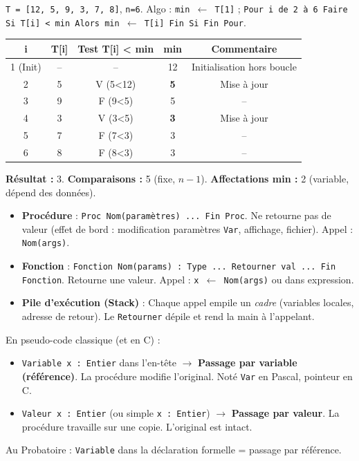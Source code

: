 \documentclass[11pt]{article}
\begin{document}
\begin{exoresolu}
\texttt{T = [12, 5, 9, 3, 7, 8]}, \texttt{n=6}.
Algo : \texttt{min $\leftarrow$ T[1]} ; \texttt{Pour i de 2 à 6 Faire Si T[i] < min Alors min $\leftarrow$ T[i] Fin Si Fin Pour}.
\begin{center}
\begin{tabular}{|c|c|c|c|c|}
\hline
\rowcolor{popblueL} \textbf{i} & \textbf{T[i]} & \textbf{Test T[i] < min} & \textbf{min} & \textbf{Commentaire} \\
\hline
1 (Init) & -- & -- & 12 & Initialisation hors boucle \\
\hline
2 & 5 & V (5<12) & \textbf{5} & Mise à jour \\
3 & 9 & F (9<5) & 5 & -- \\
4 & 3 & V (3<5) & \textbf{3} & Mise à jour \\
5 & 7 & F (7<3) & 3 & -- \\
6 & 8 & F (8<3) & 3 & -- \\
\hline
\end{tabular}
\end{center}
\textbf{Résultat :} 3. \textbf{Comparaisons :} 5 (fixe, $n-1$). \textbf{Affectations min :} 2 (variable, dépend des données).
\end{exoresolu}

\begin{propriete}
\begin{itemize}
\item \textbf{Procédure} : \texttt{Proc Nom(paramètres) ... Fin Proc}. Ne retourne pas de valeur (effet de bord : modification paramètres \texttt{Var}, affichage, fichier). Appel : \texttt{Nom(args)}.
\item \textbf{Fonction} : \texttt{Fonction Nom(params) : Type ... Retourner val ... Fin Fonction}. Retourne une valeur. Appel : \texttt{x $\leftarrow$ Nom(args)} ou dans expression.
\item \textbf{Pile d'exécution (Stack)} : Chaque appel empile un \emph{cadre} (variables locales, adresse de retour). Le \texttt{Retourner} dépile et rend la main à l'appelant.
\end{itemize}
\end{propriete}

\begin{attention}
En pseudo-code classique (et en C) :
\begin{itemize}
\item \texttt{Variable x : Entier} dans l'en-tête $\to$ \textbf{Passage par variable (référence)}. La procédure modifie l'original. Noté \texttt{Var} en Pascal, pointeur en C.
\item \texttt{Valeur x : Entier} (ou simple \texttt{x : Entier}) $\to$ \textbf{Passage par valeur}. La procédure travaille sur une copie. L'original est intact.
\end{itemize}
Au Probatoire : \texttt{Variable} dans la déclaration formelle = passage par référence.
\end{attention}
\end{document}
